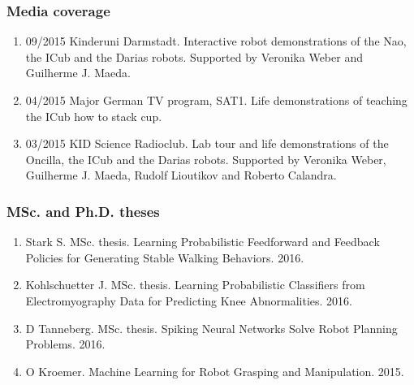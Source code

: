 \subsubsection{Media coverage}%

\begin{enumerate}
\item 09/2015 Kinderuni Darmstadt. Interactive robot demonstrations of the Nao, the ICub and the Darias robots. Supported by Veronika Weber and Guilherme J. Maeda.
\item 04/2015 Major German TV program, SAT1. Life demonstrations of teaching the ICub how to stack cup.
\item 03/2015 KID Science Radioclub. Lab tour and life demonstrations of the Oncilla, the ICub and the Darias robots. Supported by Veronika Weber, Guilherme J. Maeda, Rudolf Lioutikov and Roberto Calandra.

\end{enumerate}

\subsubsection{MSc. and Ph.D. theses}%
\begin{enumerate}
 \item Stark S. MSc. thesis. Learning Probabilistic Feedforward and Feedback Policies for Generating Stable Walking Behaviors. 2016.
 \item Kohlschuetter J. MSc. thesis. Learning Probabilistic Classifiers from Electromyography Data for Predicting Knee Abnormalities. 2016.
 \item D Tanneberg. MSc. thesis. Spiking Neural Networks Solve Robot Planning Problems. 2016.
 \item O Kroemer. Machine Learning for Robot Grasping and Manipulation. 2015.
\end{enumerate}

